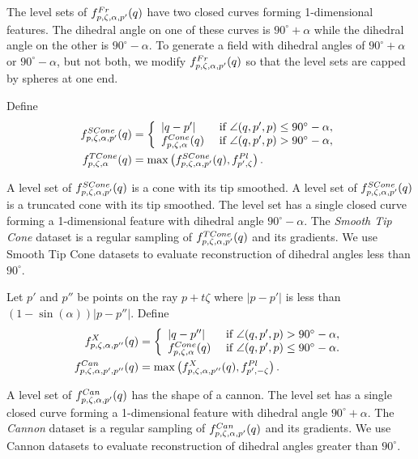 The level sets of $f^{Fr}_{p,\zeta,\alpha,p'}(q)$
have two closed curves forming 1-dimensional features.
The dihedral angle on one of these curves is $90^\circ + \alpha$
while the dihedral angle on the other is $90^\circ - \alpha$.
To generate a field with dihedral angles of $90^\circ + \alpha$
or $90^\circ - \alpha$, but not both,
we modify $f^{Fr}_{p,\zeta,\alpha,p'}(q)$ so that the level sets
are capped by spheres at one end.

Define
\begin{align*}
f^{SCone}_{p,\zeta,\alpha,p'}(q) & =
\left \{
\begin{array}{ll}
|q-p'| & \mbox{ if } \angle(q,p',p) \le 90^\circ - \alpha,\\
f^{Cone}_{p,\zeta,\alpha}(q) & \mbox{ if } 
  \angle(q,p',p) > 90^\circ - \alpha,
\end{array}
\right .
\\
f^{TCone}_{p,\zeta,\alpha}(q) & = 
\max \left ( f^{SCone}_{p,\zeta,\alpha,p'}(q), f^{Pl}_{p',\zeta} \right ).
\end{align*}

A level set of $f^{SCone}_{p,\zeta,\alpha,p'}(q)$ is a cone
with its tip smoothed.
A level set of $f^{SCone}_{p,\zeta,\alpha,p'}(q)$ is a truncated cone
with its tip smoothed.
The level set has a single closed curve forming a 1-dimensional feature
with dihedral angle $90^\circ - \alpha$.
The {\em Smooth Tip Cone} dataset is a regular sampling
of $f^{TCone}_{p,\zeta,\alpha,p'}(q)$ and its gradients.
We use Smooth Tip Cone datasets to evaluate reconstruction
of dihedral angles less than $90^\circ$.

Let $p'$ and $p''$ be points on the ray $p + t \zeta$ where
$|p-p'|$ is less than $(1-\sin(\alpha)) |p-p''|$.
Define
\begin{align*}
f^{X}_{p,\zeta,\alpha,p''}(q) & =
\left \{
\begin{array}{ll}
|q-p''| & \mbox{ if } \angle(q,p',p) > 90^\circ - \alpha,\\
f^{Cone}_{p,\zeta,\alpha}(q) & \mbox{ if } \angle(q,p',p) \le 90^\circ - \alpha.
\end{array}
\right .
\\
f^{Can}_{p,\zeta,\alpha,p',p''}(q) & =
\max \left ( f^{X}_{p,\zeta,\alpha,p''}(q), f^{Pl}_{p',-\zeta} \right ) .
\end{align*}

A level set of $f^{Can}_{p,\zeta,\alpha,p'}(q)$ has the shape of a cannon.
The level set has a single closed curve forming a 1-dimensional feature
with dihedral angle $90^\circ + \alpha$.
The {\em Cannon} dataset is a regular sampling
of $f^{Can}_{p,\zeta,\alpha,p'}(q)$ and its gradients.
We use Cannon datasets to evaluate reconstruction
of dihedral angles greater than $90^\circ$.



